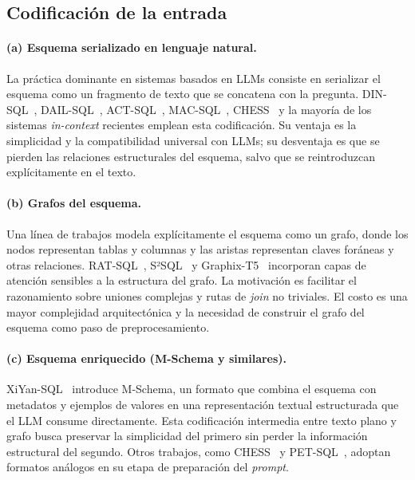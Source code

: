 \subsection{Codificación de la entrada}
\label{subsec:sota-d3a-encoding}

\paragraph{(a) Esquema serializado en lenguaje natural.} La práctica
dominante en sistemas basados en \acp{LLM} consiste en serializar el
esquema como un fragmento de texto que se concatena con la pregunta.
DIN-SQL~\cite{DIN-SQL2023}, DAIL-SQL~\cite{DAIL-SQL2023},
ACT-SQL~\cite{ACT-SQL2023}, MAC-SQL~\cite{MAC-SQL2023},
CHESS~\cite{CHESS2024} y la mayoría de los sistemas \emph{in-context}
recientes emplean esta codificación. Su ventaja es la simplicidad y la
compatibilidad universal con \acp{LLM}; su desventaja es que se pierden
las relaciones estructurales del esquema, salvo que se reintroduzcan
explícitamente en el texto.

\paragraph{(b) Grafos del esquema.} Una línea de trabajos modela
explícitamente el esquema como un grafo, donde los nodos representan
tablas y columnas y las aristas representan claves foráneas y otras
relaciones. RAT-SQL~\cite{RAT-SQL2021}, S²SQL~\cite{S2SQL2022} y
Graphix-T5~\cite{Graphix-T52022} incorporan capas de atención sensibles
a la estructura del grafo. La motivación es facilitar el razonamiento
sobre uniones complejas y rutas de \emph{join} no triviales. El costo
es una mayor complejidad arquitectónica y la necesidad de construir el
grafo del esquema como paso de preprocesamiento.

\paragraph{(c) Esquema enriquecido (M-Schema y similares).}
XiYan-SQL~\cite{XiYan-SQL2024} introduce M-Schema, un formato que
combina el esquema con metadatos y ejemplos de valores en una
representación textual estructurada que el \ac{LLM} consume directamente.
Esta codificación intermedia entre texto plano y grafo busca preservar
la simplicidad del primero sin perder la información estructural del
segundo. Otros trabajos, como CHESS~\cite{CHESS2024} y
PET-SQL~\cite{PET-SQL2024}, adoptan formatos análogos en su etapa de
preparación del \emph{prompt}.


